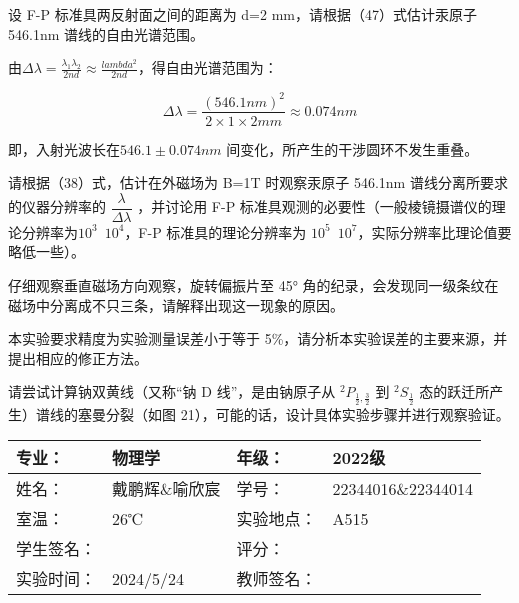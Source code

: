 \documentclass[dvipsnames, svgnames,a4paper,11pt]{article}
\begin{document}
\begin{question}
	设 F-P 标准具两反射面之间的距离为 d=2 mm，请根据（47）式估计汞原子 546.1nm 谱线的自由光谱范围。
\end{question}


	由$\Delta \lambda = \frac{\lambda_1 \lambda_2}{2 n d} \approx \frac{lambda^2}{2 n d}$，得自由光谱范围为：

	\[
		\Delta \lambda = \frac{(546.1 nm)^2}{2 \times 1 \times 2mm} \approx 0.074nm
	\]


	即，入射光波长在$546.1 \pm 0.074 nm$ 间变化，所产生的干涉圆环不发生重叠。



\begin{question}
	请根据（38）式，估计在外磁场为 B=1T 时观察汞原子 546.1nm 谱线分离所要求的仪器分辨率的 $\dfrac{\lambda}{\Delta \lambda}$ ，并讨论用 F-P 标准具观测的必要性（一般棱镜摄谱仪的理论分辨率为$10^3$~$10^4$，F-P 标准具的理论分辨率为 $10^5$~$10^7$，实际分辨率比理论值要略低一些）。
\end{question}





\begin{question}
	仔细观察垂直磁场方向观察，旋转偏振片至 45° 角的纪录，会发现同一级条纹在磁场中分离成不只三条，请解释出现这一现象的原因。
\end{question}







\begin{question}
	本实验要求精度为实验测量误差小于等于 5\%，请分析本实验误差的主要来源，并提出相应的修正方法。
\end{question}








\begin{question}
	请尝试计算钠双黄线（又称“钠 D 线”，是由钠原子从 $^2P_{\frac{1}{2}, \frac{3}{2}}$ 到 $^2S_{\frac{1}{2}}$ 态的跃迁所产生）谱线的塞曼分裂（如图 21），可能的话，设计具体实验步骤并进行观察验证。
\end{question}











\clearpage
\begin{table}
	\renewcommand\arraystretch{1.7}
	\centering
	\begin{tabularx}{\textwidth}{|X|X|X|X|}
	\hline
	专业：& 物理学 &年级：& 2022级 \\
	\hline
	姓名：& 戴鹏辉\&喻欣宸 & 学号：& 22344016\&22344014 \\
	\hline
	室温：& 26℃ & 实验地点： & A515 \\
	\hline
	学生签名：& & 评分： &\\
	\hline
	实验时间：& 2024/5/24 & 教师签名：&\\
	\hline
	\end{tabularx}
\end{table}
\end{document}
